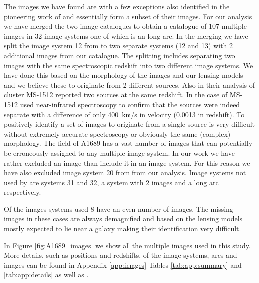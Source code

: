 \documentclass[useAMS,usenatbib]{mn2e}
\newcounter{one}   \setcounter{one}{1}
\newcounter{two}   \setcounter{two}{2}
\begin{document}
The images we have found are with a few exceptions also identified in
the pioneering work of \citet{broadhurst:05} and essentially form a
subset of their images. For our analysis we have merged the two image
catalogues to obtain a catalogue of 107 multiple images in 32 image
systems one of which is an long arc. In the merging we have split the
image system 12 from \citet{broadhurst:05} to two separate systems (12
and 13) with 2 additional images from our catalogue. The splitting
includes separating two images with the same spectroscopic redshift
into two different image systems. We have done this based on the
morphology of the images and our lensing models and we believe these
to originate from 2 different sources. Also \citet{seitz:98} in their
analysis of cluster MS-1512 reported two sources at the same
redshift. In the case of MS-1512 \citet{teplitz:04} used near-infrared
spectroscopy to confirm that the sources were indeed separate with a
difference of only 400~km/s in velocity (0.0013 in redshift). To
positively identify a set of images to originate from a single source
is very difficult without extremely accurate spectroscopy or obviously
the same (complex) morphology. The field of A1689 has a vast number of
images that can potentially be erroneously assigned to any multiple
image system. In our work we have rather excluded an image than
include it in an image system. For this reason we have also
excluded image system 20 from \citet{broadhurst:05} from our
analysis. Image systems not used by \citet{broadhurst:05} are systems
31 and 32, a system with 2 images and a long arc respectively.

Of the images systems used 8 have an even number of images. The
missing images in these cases are always demagnified and based on the
lensing models mostly expected to lie near a galaxy making their
identification very difficult.

In Figure \ref{fig:A1689_images} we show all the multiple images used
in this study. More details, such as positions and redshifts, of the
image systems, arcs and images can be found in Appendix
\ref{app:images} Tables \ref{tab:app:summary} and
\ref{tab:app:details} as well as \citet{broadhurst:05}.
\end{document}
